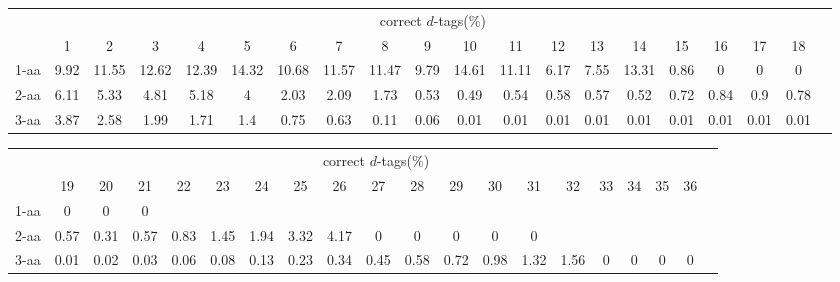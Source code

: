 \documentclass{article}
\begin{document}
\begin{table}[h]\tiny
\vspace{3mm}
{\centering
\begin{center}
\begin{tabular}{|l|c|c|c|c|c|c|c|c|c|c|c|c|c|c|c|c|c|c|c|}
  \hline
  & \multicolumn{ 18 }{|c|}{correct $d$-tags(\%)} \\
  \cline{2- 19}
    & 1 & 2 & 3 & 4 & 5 & 6 & 7 & 8 & 9 & 10 & 11 & 12 & 13 & 14 & 15 & 16 & 17 & 18\\
  \hline
1-aa  & 9.92 & 11.55 & 12.62 & 12.39 & 14.32 & 10.68 & 11.57 & 11.47 & 9.79 & 14.61 & 11.11 & 6.17 & 7.55 & 13.31 & 0.86 & 0 & 0 & 0\\
2-aa  & 6.11 & 5.33 & 4.81 & 5.18 & 4 & 2.03 & 2.09 & 1.73 & 0.53 & 0.49 & 0.54 & 0.58 & 0.57 & 0.52 & 0.72 & 0.84 & 0.9 & 0.78\\
3-aa  & 3.87 & 2.58 & 1.99 & 1.71 & 1.4 & 0.75 & 0.63 & 0.11 & 0.06 & 0.01 & 0.01 & 0.01 & 0.01 & 0.01 & 0.01 & 0.01 & 0.01 & 0.01\\
 \hline
\end{tabular}
\end{center}
\par}
\centering

\vspace{3mm}
\label{table:correct-d-tags}
\end{table}
\begin{table}[h]\tiny
\vspace{3mm}
{\centering
\begin{center}
\begin{tabular}{|l|c|c|c|c|c|c|c|c|c|c|c|c|c|c|c|c|c|c|c|}
  \hline
  & \multicolumn{ 18 }{|c|}{correct $d$-tags(\%)} \\
  \cline{2- 19}
    & 19 & 20 & 21 & 22 & 23 & 24 & 25 & 26 & 27 & 28 & 29 & 30 & 31 & 32 & 33 & 34 & 35 & 36\\
  \hline
1-aa  & 0 & 0 & 0 &  &  &  &  &  &  &  &  &  &  &  &  &  &  & \\
2-aa  & 0.57 & 0.31 & 0.57 & 0.83 & 1.45 & 1.94 & 3.32 & 4.17 & 0 & 0 & 0 & 0 & 0 &  &  &  &  & \\
3-aa  & 0.01 & 0.02 & 0.03 & 0.06 & 0.08 & 0.13 & 0.23 & 0.34 & 0.45 & 0.58 & 0.72 & 0.98 & 1.32 & 1.56 & 0 & 0 & 0 & 0\\
 \hline
\end{tabular}
\end{center}
\par}
\centering

\vspace{3mm}
\label{table:correct-d-tags}
\end{table}
\end{document}
